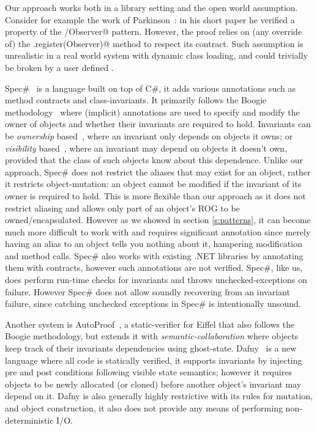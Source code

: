 Our approach works both  in a library setting and the open world assumption.
Consider for example the work of Parkinson~\cite{parkinson2007class}: in his short paper he verified a property of the \Q@Subject/Observer@ pattern. However, the proof relies on (any override of) the \Q@Subject.register(Observer)@ method to respect its contract. Such assumption is unrealistic in a real world system with dynamic class loading, and could trivially be broken by a user defined \Q@EvilSubject@.

Spec\#~\cite{Barnett:2004:SPS:2131546.2131549} is a language built on top of C\#, it adds various annotations such as method contracts and class-invariants. 
It primarily follows the Boogie methodology~\cite{DBLP:journals/tcs/NaumannB06} where (implicit) annotations are used to specify and modify the owner of objects and whether their invariants are required to hold. Invariants can be \emph{ownership} based~\cite{DBLP:journals/jot/BarnettDFLS04}, where an invariant only depends on objects it owns; or \emph{visibility} based~\cite{DBLP:conf/mpc/BarnettN04,DBLP:conf/ecoop/LeinoM04}, where an invariant may depend on objects it doesn't own, provided that the class of such objects know about this dependence. Unlike our approach, Spec\# does not restrict the aliases that may exist for an object, rather it restricts object-mutation: an object cannot be modified if the invariant of its owner is required to hold. This is more flexible than our approach as it does not restrict aliasing and allows only part of an object's ROG to be owned/encapsulated. However as we showed in section \ref{s:patterns}, it can become much more difficult to work with and requires significant annotation since merely having an alias to an object tells you nothing about it, hampering modification and method calls. Spec\# also works with existing .NET libraries by annotating them with contracts, however such annotations are not verified. Spec\#, like us, does perform run-time checks for invariants and throws unchecked-exceptions on failure.  However Spec\# does not allow soundly recovering from an invariant failure, since catching unchecked exceptions in Spec\# is intentionally unsound.~\cite{Leino2004ExceptionSF}


Another system is AutoProof~\cite{DBLP:conf/fm/PolikarpovaTFM14}, a static-verifier for Eiffel that also follows the Boogie methodology, but extends it with \emph{semantic-collaboration} where objects keep track of their invariants dependencies using ghost-state.
Dafny~\cite{DBLP:conf/sigada/Leino12} is a new language where all code is statically verified, it supports invariants by injecting pre and post conditions following visible state semantics;
however it requires objects to be newly allocated (or cloned) before another object's invariant may depend on it.
Dafny is also generally highly restrictive with its rules for mutation, and object construction, it also does not provide any means of performing non-deterministic I/O.




